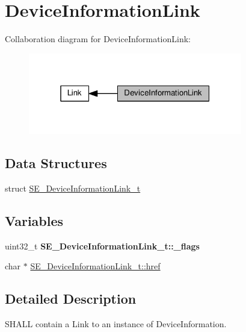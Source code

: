 \hypertarget{group__DeviceInformationLink}{}\section{Device\+Information\+Link}
\label{group__DeviceInformationLink}
Collaboration diagram for Device\+Information\+Link\+:\nopagebreak
\begin{figure}[H]
\begin{center}
\leavevmode
\includegraphics[width=265pt]{group__DeviceInformationLink}
\end{center}
\end{figure}
\subsection*{Data Structures}
\begin{DoxyCompactItemize}
\item 
struct \hyperlink{structSE__DeviceInformationLink__t}{S\+E\+\_\+\+Device\+Information\+Link\+\_\+t}
\end{DoxyCompactItemize}
\subsection*{Variables}
\begin{DoxyCompactItemize}
\item 
\mbox{\label{group__DeviceInformationLink_gaca8c16e4e57a3be83068343d6f8158dc}} 
uint32\+\_\+t {\bfseries S\+E\+\_\+\+Device\+Information\+Link\+\_\+t\+::\+\_\+flags}
\item 
char $\ast$ \hyperlink{group__DeviceInformationLink_ga22d97c548ebe5e890aca24545365b985}{S\+E\+\_\+\+Device\+Information\+Link\+\_\+t\+::href}
\end{DoxyCompactItemize}


\subsection{Detailed Description}
S\+H\+A\+LL contain a Link to an instance of Device\+Information. 

